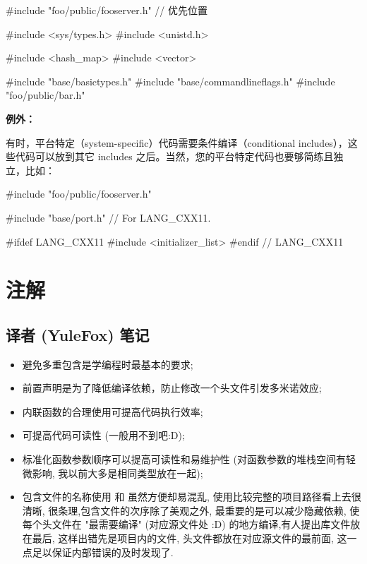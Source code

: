 \begin{cppcode}
	#include "foo/public/fooserver.h" // 优先位置

	#include <sys/types.h>
	#include <unistd.h>

	#include <hash_map>
	#include <vector>

	#include "base/basictypes.h"
	#include "base/commandlineflags.h"
	#include "foo/public/bar.h"
\end{cppcode}

\textbf{例外：}

有时，平台特定（system-specific）代码需要条件编译（conditional includes），这些代码可以放到其它 includes 之后。当然，您的平台特定代码也要够简练且独立，比如：

\begin{cppcode}
	#include "foo/public/fooserver.h"

	#include "base/port.h"  // For LANG_CXX11.

	#ifdef LANG_CXX11
	#include <initializer_list>
	#endif  // LANG_CXX11
\end{cppcode}


\section{注解}

\subsection{译者 (YuleFox) 笔记}

\begin{itemize}
	\item  避免多重包含是学编程时最基本的要求;
	\item  前置声明是为了降低编译依赖，防止修改一个头文件引发多米诺效应;
	\item  内联函数的合理使用可提高代码执行效率;
	\item  {} 可提高代码可读性 (一般用不到吧:D);
	\item  标准化函数参数顺序可以提高可读性和易维护性 (对函数参数的堆栈空间有轻微影响, 我以前大多是相同类型放在一起);
	\item  包含文件的名称使用  和  虽然方便却易混乱, 使用比较完整的项目路径看上去很清晰, 很条理,包含文件的次序除了美观之外, 最重要的是可以减少隐藏依赖, 使每个头文件在 "最需要编译" (对应源文件处 :D) 的地方编译,有人提出库文件放在最后, 这样出错先是项目内的文件, 头文件都放在对应源文件的最前面, 这一点足以保证内部错误的及时发现了.
\end{itemize}

